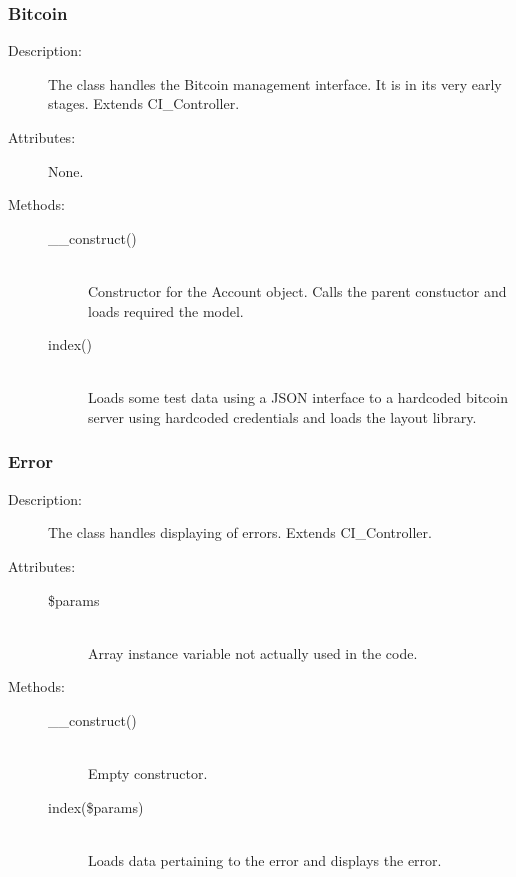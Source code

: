 \documentclass[11pt]{article} %
\begin{document}
\subsubsection{Bitcoin}
\begin{description}
\item[Description:] The class handles the Bitcoin management interface. It is in its very early stages. Extends CI\_Controller.
\item[Attributes:] None.
\item[Methods:] \textbf{ }
\begin{description}
\item[\_\_construct()]  \textbf{ }\\
Constructor for the Account object. Calls the parent constuctor and loads required the model.
\item[index()]  \textbf{ }\\
Loads some test data using a JSON interface to a hardcoded bitcoin server using hardcoded credentials and loads the layout library.
\end{description} 
\end{description} 


\subsubsection{Error}
\begin{description}
\item[Description:] The class handles displaying of errors. Extends CI\_Controller.
\item[Attributes:] \textbf{ }
\begin{description}
\item[\$params]  \textbf{ }\\
Array instance variable not actually used in the code.
\end{description}
\item[Methods:] \textbf{ }
\begin{description}
\item[\_\_construct()]  \textbf{ }\\
Empty constructor.
\item[index(\$params)]  \textbf{ }\\
Loads data pertaining to the error and displays the error.
\end{description} 
\end{description} 
\end{document}
